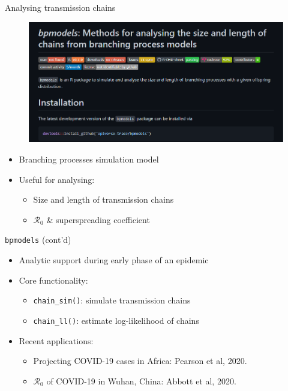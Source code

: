 \documentclass[10pt]{beamer}
\begin{document}
\begin{frame}[fragile]{Analysing transmission chains}
\begin{figure}
	\centering
	\includegraphics[scale=0.35]{../figures/bpmodels_homepage.PNG}
\end{figure}
\begin{itemize}
\item Branching processes simulation model
\item Useful for analysing:
\begin{itemize}
	\item Size and length of transmission chains 
	\item $\mathcal{R}_0$ \& superspreading coefficient
\end{itemize}
\end{itemize}
\end{frame}

\begin{frame}[fragile]{\texttt{bpmodels} (cont'd)}
\begin{itemize}
\item Analytic support during early phase of an epidemic
\item Core functionality:
\begin{itemize}
	\item \texttt{chain\_sim()}: simulate transmission chains 
	\item \texttt{chain\_ll()}: estimate log-likelihood of chains
\end{itemize}
\item Recent applications:	
\begin{itemize}
	\item Projecting COVID-19 cases in Africa: Pearson et al, 2020.
	\item $\mathcal{R}_0$ of COVID-19 in Wuhan, China: Abbott et al, 2020.
\end{itemize}
\end{itemize}
\end{frame}
\end{document}
